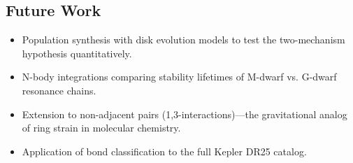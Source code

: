 \documentclass[twocolumn]{aastex631}
\begin{document}
\subsection{Future Work}
\begin{itemize}
  \item Population synthesis with disk evolution models to test the
        two-mechanism hypothesis quantitatively.
  \item N-body integrations comparing stability lifetimes of M-dwarf vs.
        G-dwarf resonance chains.
  \item Extension to non-adjacent pairs (1,3-interactions)---the gravitational
        analog of ring strain in molecular chemistry.
  \item Application of bond classification to the full Kepler DR25 catalog.
\end{itemize}



\end{document}
